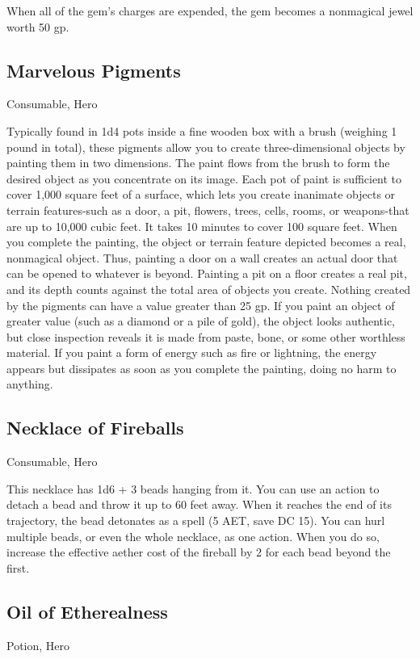 When all of the gem's charges are expended, the gem becomes a nonmagical jewel worth 50 gp.

\subsection{Marvelous Pigments}
Consumable, Hero 

Typically found in 1d4 pots inside a fine wooden box with a brush (weighing 1 pound in total), these pigments allow you to create three-dimensional objects by painting them in two dimensions. The paint flows from the brush to form the desired object as you concentrate on its image. Each pot of paint is sufficient to cover 1,000 square feet of a surface, which lets you create inanimate objects or terrain features-such as a door, a pit, flowers, trees, cells, rooms, or weapons-that are up to 10,000 cubic feet. It takes 10 minutes to cover 100 square feet.  When you complete the painting, the object or terrain feature depicted becomes a real, nonmagical object. Thus, painting a door on a wall creates an actual door that can be opened to whatever is beyond. Painting a pit on a floor creates a real pit, and its depth counts against the total area of objects you create.  Nothing created by the pigments can have a value greater than 25 gp. If you paint an object of greater value (such as a diamond or a pile of gold), the object looks authentic, but close inspection reveals it is made from paste, bone, or some other worthless material.  If you paint a form of energy such as fire or lightning, the energy appears but dissipates as soon as you complete the painting, doing no harm to anything.

\subsection{Necklace of Fireballs}
Consumable, Hero 

This necklace has 1d6 + 3 beads hanging from it. You can use an action to detach a bead and throw it up to 60 feet away. When it reaches the end of its trajectory, the bead detonates as a  spell (5 AET, save DC 15). You can hurl multiple beads, or even the whole necklace, as one action. When you do so, increase the effective aether cost of the fireball by 2 for each bead beyond the first.

\subsection{Oil of Etherealness}
Potion, Hero

